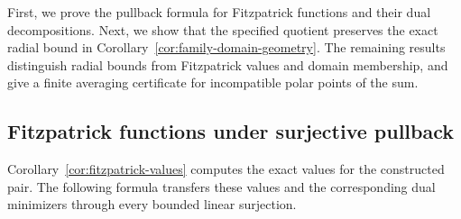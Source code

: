 \documentclass[11pt]{article}
\theoremstyle{definition}
\theoremstyle{remark}
\begin{document}
First, we prove the pullback formula for Fitzpatrick functions and their dual decompositions. Next, we show that the specified quotient preserves the exact radial bound in Corollary~\ref{cor:family-domain-geometry}. The remaining results distinguish radial bounds from Fitzpatrick values and domain membership, and give a finite averaging certificate for incompatible polar points of the sum.

\subsection{Fitzpatrick functions under surjective pullback}
\label{subsec:appendix-fitzpatrick-transfer}

Corollary~\ref{cor:fitzpatrick-values} computes the exact values for the constructed pair. The following formula transfers these values and the corresponding dual minimizers through every bounded linear surjection.
\end{document}
